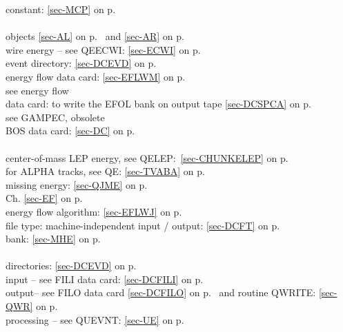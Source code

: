  constant: \ref{sec-MCP} on p.~\pageref{sec-MCP}\\
 \\
 \mysubitem objects \ref{sec-AL} on p.~\pageref{sec-AL} and
 \ref{sec-AR} on p.~\pageref{sec-AR}\\
 \mysubitem wire energy -- see QEECWI: \ref{sec-ECWI} on p.~\pageref{sec-ECWI}\\
 event directory: \ref{sec-DCEVD} on p.~\pageref{sec-DCEVD}\\
 energy flow data card: \ref{sec-EFLWM} on p.~\pageref{sec-EFLWM}\\
 see energy flow\\
 data card: to write the EFOL bank on output tape
 \ref{sec-DCSPCA} on p.~\pageref{sec-DCSPCA}\\
 see GAMPEC, obsolete\\
 BOS data card: \ref{sec-DC} on p.~\pageref{sec-DC}\\
 \\
 \mysubitem center-of-mass LEP energy, see QELEP:~\ref{sec-CHUNKELEP} on p.~\pageref{sec-CHUNKELEP}\\
 \mysubitem for ALPHA tracks,
 see QE: \ref{sec-TVABA} on p.~\pageref{sec-TVABA}\\
 \mysubitem missing energy: \ref{sec-QJME} on p.~\pageref{sec-QJME}\\
 Ch. \ref{sec-EF} on p.~\pageref{sec-EF}\\
 energy flow algorithm: \ref{sec-EFLWJ} on p.~\pageref{sec-EFLWJ}\\
 file type: machine-independent input / output:
 \ref{sec-DCFT} on p.~\pageref{sec-DCFT}\\
 bank: \ref{sec-MHE} on p.~\pageref{sec-MHE}\\
 \\
 \mysubitem directories: \ref{sec-DCEVD} on p.~\pageref{sec-DCEVD}\\
 \mysubitem input -- see FILI data card: \ref{sec-DCFILI} on p.~\pageref{sec-DCFILI}\\
 \mysubitem output-- see FILO data card \ref{sec-DCFILO} on p.~\pageref{sec-DCFILO}
 and routine QWRITE: \ref{sec-QWR} on p.~\pageref{sec-QWR}\\
 \mysubitem processing -- see QUEVNT: \ref{sec-UE} on p.~\pageref{sec-UE}
 
